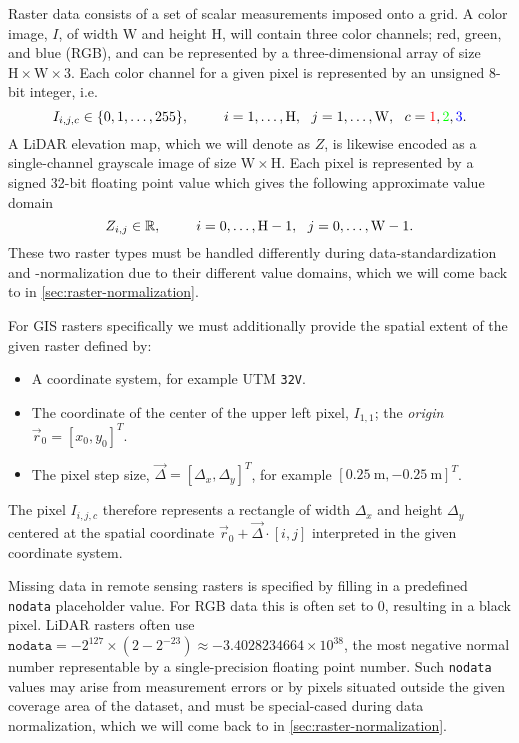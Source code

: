 Raster data consists of a set of scalar measurements imposed onto a grid.
A color image, $I$, of width $\mathrm{W}$ and height $\mathrm{H}$, will contain three color channels; red, green, and blue (RGB), and can be represented by a three-dimensional array of size $\mathrm{H} \times \mathrm{W} \times \mathrm{3}$.
Each color channel for a given pixel is represented by an unsigned 8-bit integer, i.e.
%
\begin{equation*}
  I_{i, j, c} \in \{0, 1, \ldots, 255\},
  \hspace{2.5em}
  i = 1, \ldots, \mathrm{H} ,
  ~~
  j = 1, \ldots, \mathrm{W},
  ~~
  c = \mathrm{\textcolor{red}{1}, \textcolor{green}{2}, \textcolor{blue}{3}}.
\end{equation*}
%
A LiDAR elevation map, which we will denote as $Z$, is likewise encoded as a single-channel grayscale image of size $\mathrm{W} \times \mathrm{H}$.
Each pixel is represented by a signed 32-bit floating point value which gives the following approximate value domain
%
\begin{equation*}
  Z_{i, j} \in \mathbb{R},
  \hspace{2.5em}
  i = 0, \ldots, \mathrm{H} - 1,
  ~~
  j = 0, \ldots, \mathrm{W} - 1.
\end{equation*}
%
These two raster types must be handled differently during data-standardization and -normalization due to their different value domains, which we will come back to in \cref{sec:raster-normalization}.

For GIS rasters specifically we must additionally provide the spatial extent of the given raster defined by:
\begin{itemize}[noitemsep]
  \item A coordinate system, for example UTM \texttt{32V}.
  \item The coordinate of the center of the upper left pixel, $I_{1, 1}$; the \textit{origin} $\vec{r}_0 = {[x_0, y_0]}^T$.
  \item The pixel step size, $\vec{\Delta} = {[\Delta_x, \Delta_y]}^T$, for example ${[\SI{0.25}{\meter}, \SI{-0.25}{\meter}]}^T$.
\end{itemize}

The pixel $I_{i, j, c}$ therefore represents a rectangle of width $\Delta_x$ and height $\Delta_y$ centered at the spatial coordinate $\vec{r}_0 + \vec{\Delta} \cdot [i, j]$ interpreted in the given coordinate system.

Missing data in remote sensing rasters is specified by filling in a predefined \texttt{nodata} placeholder value.
For RGB data this is often set to $0$, resulting in a black pixel.
LiDAR rasters often use $\texttt{nodata} = -2^{127} \times (2 - 2^{-23}) \approx -3.4028234664 \times 10^{38}$, the most negative normal number representable by a single-precision floating point number.
Such \texttt{nodata} values may arise from measurement errors or by pixels situated outside the given coverage area of the dataset, and must be special-cased during data normalization, which we will come back to in \cref{sec:raster-normalization}.

